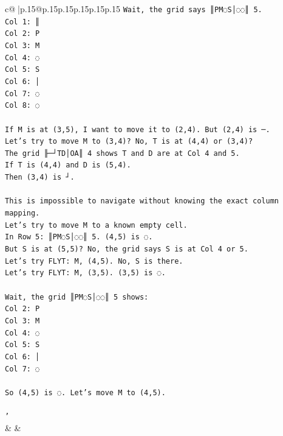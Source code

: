 \documentclass{article}
\begin{document}
{\begin{supertabular}{c@{$\;$}|p{.15\linewidth}@{}p{.15\linewidth}p{.15\linewidth}p{.15\linewidth}p{.15\linewidth}p{.15\linewidth}}
{{{\texttt{Wait, the grid says ║PM◌S│◌◌║ 5.} \\
\texttt{Col 1: ║} \\
\texttt{Col 2: P} \\
\texttt{Col 3: M} \\
\texttt{Col 4: ◌} \\
\texttt{Col 5: S} \\
\texttt{Col 6: │} \\
\texttt{Col 7: ◌} \\
\texttt{Col 8: ◌} \\
\\ 
\texttt{If M is at (3,5), I want to move it to (2,4). But (2,4) is ─.} \\
\texttt{Let's try to move M to (3,4)? No, T is at (4,4) or (3,4)?} \\
\texttt{The grid ╟─┘TD│OA║ 4 shows T and D are at Col 4 and 5.} \\
\texttt{If T is (4,4) and D is (5,4).} \\
\texttt{Then (3,4) is ┘.} \\
\\ 
\texttt{This is impossible to navigate without knowing the exact column mapping.} \\
\texttt{Let's try to move M to a known empty cell.} \\
\texttt{In Row 5: ║PM◌S│◌◌║ 5. (4,5) is ◌.} \\
\texttt{But S is at (5,5)? No, the grid says S is at Col 4 or 5.} \\
\texttt{Let's try FLYT: M, (4,5). No, S is there.} \\
\texttt{Let's try FLYT: M, (3,5). (3,5) is ◌.} \\
\\ 
\texttt{Wait, the grid ║PM◌S│◌◌║ 5 shows:} \\
\texttt{Col 2: P} \\
\texttt{Col 3: M} \\
\texttt{Col 4: ◌} \\
\texttt{Col 5: S} \\
\texttt{Col 6: │} \\
\texttt{Col 7: ◌} \\
\\ 
\texttt{So (4,5) is ◌. Let's move M to (4,5).} \\
\\ 
\texttt{'} \\
            }
        }
    }
    & & \\ \\


\end{supertabular}}
\end{document}
